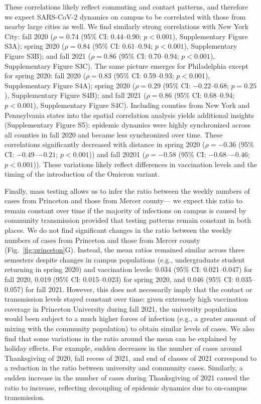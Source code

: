 \documentclass[12pt]{article}
\newcommand{\fref}[1]{Fig.~\ref{fig:#1}}
\begin{document}
These correlations likely reflect commuting and contact patterns, and therefore we expect SARS-CoV-2 dynamics on campus to be correlated with those from nearby large cities as well. 
We find similarly strong correlations with New York City: fall 2020 ($\rho = 0.74$ (95\% CI: 0.44--0.90; $p < 0.001$), Supplementary Figure S3A); spring 2020 ($\rho = 0.84$ (95\% CI: 0.61--0.94; $p < 0.001$), Supplementary Figure S3B); and fall 2021 ($\rho = 0.86$ (95\% CI: 0.70--0.94; $p < 0.001$), Supplementary Figure S3C).
The same picture emerges for Philadelphia except for spring 2020: fall 2020 ($\rho = 0.83$ (95\% CI: 0.59--0.93; $p < 0.001$), Supplementary Figure S4A); spring 2020 ($\rho = 0.29$ (95\% CI: $-0.22$--0.68; $p = 0.25$), Supplementary Figure S4B); and fall 2021 ($\rho = 0.86$ (95\% CI: 0.68--0.94; $p < 0.001$), Supplementary Figure S4C).
Including counties from New York and Pennsylvania states into the spatial correlation analysis yields additional insights (Supplementary Figure S5):
epidemic dynamics were highly synchronized across all counties in fall 2020 and became less synchronized over time. 
These correlations significantly decreased with distance in spring 2020 ($\rho = -0.36$ (95\% CI: $-0.49$--$-0.21$; $p < 0.001$)) and fall 20201 ($\rho = -0.58$ (95\% CI: $-0.68$--$-0.46$; $p < 0.001$)).
These variations likely reflect differences in vaccination levels and the timing of the introduction of the Omicron variant.

Finally, mass testing allows us to infer the ratio between the weekly numbers of cases from Princeton and those from Mercer county---
we expect this ratio to remain constant over time if the majority of infections on campus is caused by community transmission provided that testing patterns remain constant in both places.
We do not find significant changes in the ratio between the weekly numbers of cases from Princeton and those from Mercer county (\fref{princeton}G).
Instead, the mean ratios remained similar across three semesters despite changes in campus populations (e.g., undergraduate student returning in spring 2020) and vaccination levels: 0.034 (95\% CI: 0.021--0.047) for fall 2020, 0.019 (95\% CI: 0.015--0.023) for spring 2020, and 0.046 (95\% CI: 0.035--0.057) for fall 2021.
However, this does not necessarily imply that the contact or transmission levels stayed constant over time: given extremely high vaccination coverage in Princeton University during fall 2021, the university population would been subject to a much higher forces of infection (e.g., a greater amount of mixing with the community population) to obtain similar levels of cases.
We also find that some variations in the ratio around the mean can be explained by holiday effects.
For example, sudden decreases in the number of cases around Thanksgiving of 2020, fall recess of 2021, and end of classes of 2021 correspond to a reduction in the ratio between university and community cases.
Similarly, a sudden increase in the number of cases during Thanksgiving of 2021 caused the ratio to increase, reflecting decoupling of epidemic dynamics due to on-campus transmission.
\end{document}
